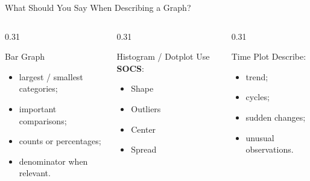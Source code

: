 \documentclass[aspectratio=169]{beamer}
\begin{document}
\begin{frame}{What Should You Say When Describing a Graph?}
  \begin{columns}[T]
    \begin{column}{0.31\textwidth}
      \begin{block}{Bar Graph}
        \begin{itemize}
          \item largest / smallest categories;
          \item important comparisons;
          \item counts or percentages;
          \item denominator when relevant.
        \end{itemize}
      \end{block}
    \end{column}
    \begin{column}{0.31\textwidth}
      \begin{block}{Histogram / Dotplot}
        Use \textbf{SOCS}:
        \begin{itemize}
          \item Shape
          \item Outliers
          \item Center
          \item Spread
        \end{itemize}
      \end{block}
    \end{column}
    \begin{column}{0.31\textwidth}
      \begin{block}{Time Plot}
        Describe:
        \begin{itemize}
          \item trend;
          \item cycles;
          \item sudden changes;
          \item unusual observations.
        \end{itemize}
      \end{block}
    \end{column}
  \end{columns}
\end{frame}
\end{document}
